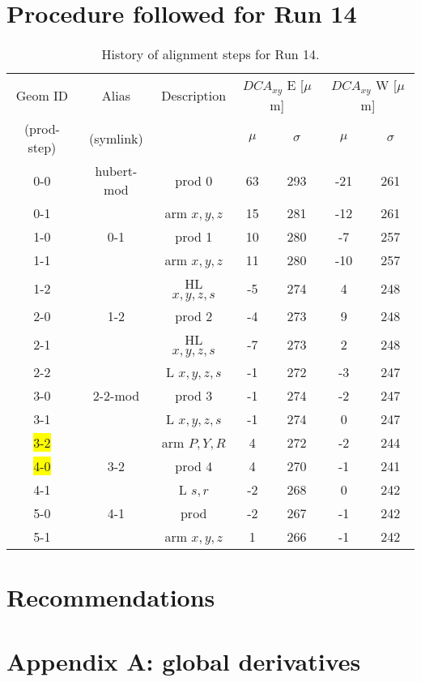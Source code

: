 \documentclass[12pt]{article}
\begin{document}
\section{Procedure followed for Run 14}
\begin{table}[htb!] \label{tab:history}
\centering
\begin{tabular}{c | c | c | c | c | c | c}
Geom ID & Alias & Description & \multicolumn{2}{c}{$DCA_{xy}$ E [$\mu$m]} 
                              & \multicolumn{2}{|c}{$DCA_{xy}$ W [$\mu$m]} \\
(prod-step) & (symlink) &     & $\mu$ & $\sigma$ & $\mu$ & $\sigma$\\
\hline
0-0 & hubert-mod & prod 0    & 63 & 293 & -21 & 261 \\
0-1 & & arm $x,y,z$          & 15 & 281 & -12 & 261 \\
1-0 & 0-1 & prod 1           & 10 & 280 &  -7 & 257 \\
1-1 & & arm $x,y,z$          & 11 & 280 & -10 & 257 \\
1-2 & & HL $x,y,z,s$         & -5 & 274 &   4 & 248 \\
2-0 & 1-2 & prod 2           & -4 & 273 &   9 & 248 \\
2-1 & & HL $x,y,z,s$         & -7 & 273 &   2 & 248 \\
2-2 & & L $x,y,z,s$          & -1 & 272 &  -3 & 247 \\
3-0 & 2-2-mod & prod 3       & -1 & 274 &  -2 & 247 \\
3-1 & & L $x,y,z,s$          & -1 & 274 &   0 & 247 \\
\colorbox{yellow}{3-2} & & arm $P,Y,R$          &  4 & 272 &  -2 & 244 \\
\colorbox{yellow}{4-0} & 3-2 & prod 4           &  4 & 270 &  -1 & 241 \\
4-1 & & L $s,r$              & -2 & 268 &   0 & 242 \\
5-0 & 4-1 & prod             & -2 & 267 &  -1 & 242 \\
5-1 & & arm $x,y,z$          &  1 & 266 &  -1 & 242 \\
\hline
\end{tabular}
\caption{History of alignment steps for Run 14.}
\end{table}

\section{Recommendations}
\section{Appendix A: global derivatives}
\end{document}
